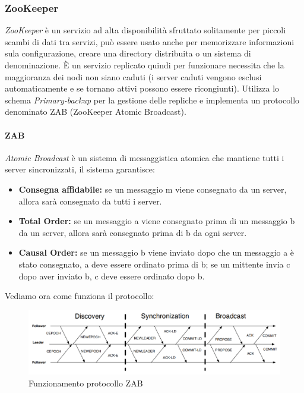 \documentclass{article}
\begin{document}
\subsubsection{ZooKeeper}
\textit{ZooKeeper} è un servizio ad alta disponibilità sfruttato solitamente per piccoli scambi di dati tra servizi, può essere usato anche per memorizzare informazioni sula configurazione, creare una directory distribuita o un sistema di denominazione. È un servizio replicato quindi per funzionare necessita che la maggioranza dei nodi non siano caduti (i server caduti vengono esclusi automaticamente e se tornano attivi possono essere ricongiunti). Utilizza lo schema \textit{Primary-backup} per la gestione delle repliche e implementa un protocollo denominato ZAB (ZooKeeper Atomic Broadcast).
\paragraph{ZAB}
\textit{Atomic Broadcast} è un sistema di messaggistica atomica che mantiene tutti i server sincronizzati, il sistema garantisce:
\begin{itemize}
    \item \textbf{Consegna affidabile:} se un messaggio m viene consegnato da un server, allora sarà consegnato da tutti i server.
    \item \textbf{Total Order:} se un messaggio a viene consegnato prima di un messaggio b da un server, allora sarà consegnato prima di b da ogni server.
    \item \textbf{Causal Order:} se un messaggio b viene inviato dopo che un messaggio a è stato consegnato, a deve essere ordinato prima di b; se un mittente invia c dopo aver inviato b, c deve essere ordinato dopo b.
\end{itemize}
Vediamo ora come funziona il protocollo:

\begin{figure}[H]
\centering
\includegraphics[scale=0.5]{img/Zab.PNG}
\caption{Funzionamento protocollo ZAB}
\end{figure}
\end{document}

